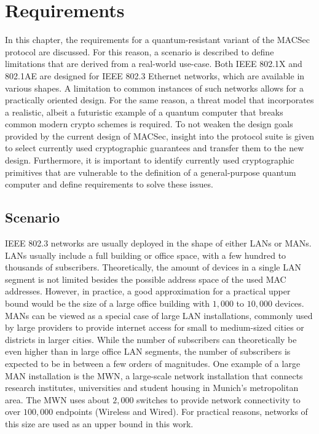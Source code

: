 \chapter{Requirements}
In this chapter, the requirements for a quantum-resistant variant of the MACSec protocol are discussed. For this reason, a scenario is described to define limitations that are derived from a real-world use-case. Both IEEE 802.1X and 802.1AE are designed for IEEE 802.3 Ethernet networks, which are available in various shapes. A limitation to common instances of such networks allows for a practically oriented design. For the same reason, a threat model that incorporates a realistic, albeit a futuristic example of a quantum computer that breaks common modern crypto schemes is required. To not weaken the design goals provided by the current design of MACSec, insight into the protocol suite is given to select currently used cryptographic guarantees and transfer them to the new design. Furthermore, it is important to identify currently used cryptographic primitives that are vulnerable to the definition of a general-purpose quantum computer and define requirements to solve these issues.

\section{Scenario}
IEEE 802.3 networks are usually deployed in the shape of either \acfp{LAN} or \acp{MAN}. \acp{LAN} usually include a full building or office space, with a few hundred to thousands of subscribers. Theoretically, the amount of devices in a single \ac{LAN} segment is not limited besides the possible address space of the used MAC addresses. However, in practice, a good approximation for a practical upper bound would be the size of a large office building with \(1,000\) to \(10,000\) devices. \acp{MAN} can be viewed as a special case of large \ac{LAN} installations, commonly used by large providers to provide internet access for small to medium-sized cities or districts in larger cities. While the number of subscribers can theoretically be even higher than in large office \ac{LAN} segments, the number of subscribers is expected to be in between a few orders of magnitudes. One example of a large \ac{MAN} installation is the \ac{MWN}, a large-scale network installation that connects research institutes, universities and student housing in Munich's metropolitan area. The \ac{MWN} uses about \(2,000\) switches to provide network connectivity to over \(100,000\) endpoints (Wireless and Wired)\cite{MWN}. For practical reasons, networks of this size are used as an upper bound in this work.

